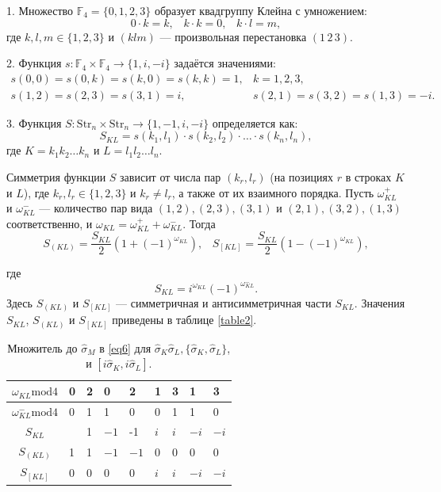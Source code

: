 \documentclass[a4paper]{report}
\begin{document}
1. Множество ${\mathbb{F}_4 = \{0,1,2,3\}}$ образует квадгруппу ${\mbox{Клейна}}$ с умножением:
$${
    0 \cdot k = k,\;\;\;
    k \cdot k = 0,\;\;\;
    k \cdot l = m,
}$$
где ${k,l,m \in \{1,2,3\}}$ и ${(klm)}$ — произвольная перестановка ${(1\,2\,3)}$.

2. Функция ${s: \mathbb{F}_4 \times \mathbb{F}_4 \to \{1, i, -i\}}$ задаётся значениями:
$${
    \begin{array}{ll}
        s(0,0) = s(0,k) = s(k,0) = s(k,k) = 1, & k=1,2,3, \\
        s(1,2) = s(2,3) = s(3,1) = i, & s(2,1) = s(3,2) = s(1,3) = -i.
    \end{array}
}$$

3. Функция ${S: \mathrm{Str}_n \times \mathrm{Str}_n \to \{1, -1, i, -i\}}$ определяется как:
$${
    S_{KL} = s(k_1, l_1) \cdot s(k_2, l_2) \cdot \ldots \cdot s(k_n, l_n),
}$$
где ${K = k_1k_2\ldots k_n}$ и ${L = l_1l_2\ldots l_n}$.

Симметрия функции ${S}$ зависит от числа пар ${(k_r, l_r)}$ (на позициях ${r}$ в строках ${K}$ и ${L}$), где ${k_r, l_r \in \{1,2,3\}}$ и ${k_r \neq l_r}$, а также от их взаимного порядка. Пусть ${\omega^+_{KL}}$ и ${\omega^-_{KL}}$ — количество пар вида ${(1,2),(2,3),(3,1)}$ и ${(2,1),(3,2),(1,3)}$ соответственно, и ${\omega_{KL} = \omega^+_{KL} + \omega^-_{KL}}$. Тогда
\begin{equation}\label{eq5}
    S_{(KL)} = \frac{S_{KL}}{2}\left(1 + (-1)^{\omega_{KL}}\right),\;\;\;
    S_{[KL]} = \frac{S_{KL}}{2}\left(1 - (-1)^{\omega_{KL}}\right),
\end{equation}

где $$S_{KL} = i^{\omega_{KL}}(-1)^{\omega^-_{KL}}.$$
Здесь ${S_{(KL)}}$ и ${S_{[KL]}}$ — симметричная и антисимметричная части ${S_{KL}}$. Значения ${S_{KL}}$, ${S_{(KL)}}$ и ${S_{[KL]}}$ приведены в таблице \ref{table2}.

\begin{table}[h!]
    \centering
    \begin{tabular}{ | c | P{1cm} | P{1cm} | P{1cm} | P{1cm} | P{1cm} | P{1cm} | P{1cm} | P{1cm} | }
        \hline
        ${\omega_{KL}\mathrm{mod4}}$     & 0 & 2 & 0      & 2      & 1     & 3     & 1      & 3      \\
        \hline
        ${\omega_{KL}^{-}\mathrm{mod4}}$ & 0 & 1 & 1      & 0      & 0     & 1     & 1      & 0      \\
        \hline\hline
        ${S_{KL}}$                       &   & 1 & ${-1}$ & -1     & ${i}$ & ${i}$ & ${-i}$ & ${-i}$ \\
        \hline
        ${S_{(KL)}}$                     & 1 & 1 & ${-1}$ & ${-1}$ & 0     & 0     & 0      & 0      \\
        \hline
        ${S_{[KL]}}$                     & 0 & 0 & 0      & 0      & ${i}$ & ${i}$ & ${-i}$ & ${-i}$ \\
        \hline
    \end{tabular}
    \caption{Множитель до ${\hat{\sigma}_M}$ в \eqref{eq6} для ${\hat{\sigma}_K\hat{\sigma}_L,\{\hat{\sigma}_K,\hat{\sigma}_L\}}$, и ${[i\hat{\sigma}_K,i\hat{\sigma}_L]}$.}\label{table1}
\end{table}
\end{document}
